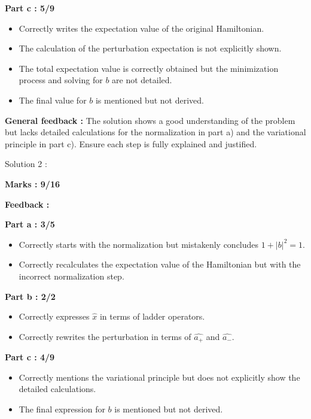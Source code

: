 \documentclass[a4paper,11pt]{article}
\begin{document}
\textbf{Part c : 5/9}

\begin{itemize}
    \item Correctly writes the expectation value of the original Hamiltonian.
    \item The calculation of the perturbation expectation is not explicitly shown.
    \item The total expectation value is correctly obtained but the minimization process and solving for $b$ are not detailed.
    \item The final value for $b$ is mentioned but not derived.
\end{itemize}

\textbf{General feedback :}
The solution shows a good understanding of the problem but lacks detailed calculations for the normalization in part a) and the variational principle in part c). Ensure each step is fully explained and justified.


Solution 2 :

\textbf{Marks : 9/16}

\textbf{Feedback :}

\textbf{Part a : 3/5}

\begin{itemize}
    \item Correctly starts with the normalization but mistakenly concludes $1 + |b|^2 = 1$.
    \item Correctly recalculates the expectation value of the Hamiltonian but with the incorrect normalization step.
\end{itemize}

\textbf{Part b : 2/2}

\begin{itemize}
    \item Correctly expresses $\hat{x}$ in terms of ladder operators.
    \item Correctly rewrites the perturbation in terms of $\hat{a_+}$ and $\hat{a_-}$.
\end{itemize}

\textbf{Part c : 4/9}

\begin{itemize}
    \item Correctly mentions the variational principle but does not explicitly show the detailed calculations.
    \item The final expression for $b$ is mentioned but not derived.
\end{itemize}
\end{document}
